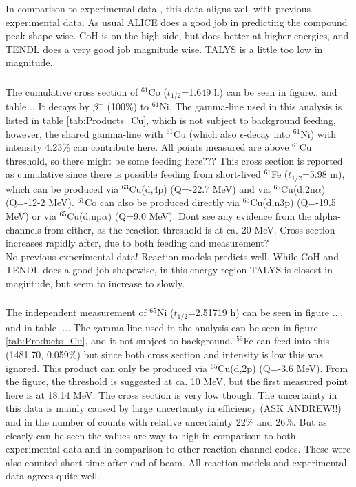 In comparison to experimental data \cite{Takacs2006a, Khandaker2014}, this data aligns well with previous experimental data. As usual ALICE does a good job in predicting the compound peak shape wise. CoH is on the high side, but does better at higher energies, and TENDL does a very good job magnitude wise. TALYS is a little too low in magnitude. 

\subsubsection{}
The cumulative cross section of $^{61}$Co ($t_{1/2}$=1.649 h) can be seen in figure.. and table .. It decays by $\beta^-$ (100\%) to $^{61}$Ni\cite{Zuber2015}. The gamma-line used in this analysis is listed in table \ref{tab:Products_Cu}, which is not subject to background feeding, however, the shared gamma-line with $^{61}$Cu (which also $\epsilon$-decay into $^{61}$Ni) with intensity 4.23\% can contribute here. All points measured are above $^{61}$Cu threshold, so there might be some feeding here??? This cross section is reported as cumulative since there is possible feeding from short-lived $^{61}$Fe ($t_{1/2}$=5.98 m), which can be produced via $^{63}$Cu(d,4p) (Q=-22.7 MeV) and via $^{65}$Cu(d,2n$\alpha$) (Q=-12-2 MeV). $^{61}$Co can also be produced directly via $^{63}$Cu(d,n3p) (Q=-19.5 MeV) or via $^{65}$Cu(d,np$\alpha$) (Q=9.0 MeV). Dont see any evidence from the alpha-channels from either, as the reaction threshold is at ca. 20 MeV. Cross section increases rapidly after, due to both feeding and measurement? \\ 

No previous experimental data! Reaction models predicts well. While CoH and TENDL does a good job shapewise, in this energy region TALYS is closest in magintude, but seem to increase to slowly. 

\subsubsection{}
The independent measurement of $^{65}$Ni ($t_{1/2}$=2.51719 h) can be seen in figure .... and in table .... The gamma-line used in the analysis can be seen in figure \ref{tab:Products_Cu}, and it not subject to background. $^{59}$Fe can feed into this (1481.70, 0.059\%) but since both cross section and intensity is low this was ignored. This product can only be produced via $^{65}$Cu(d,2p) (Q=-3.6 MeV). From the figure, the threshold is suggested at ca. 10 MeV, but the first measured point here is at 18.14 MeV. The cross section is very low though. The uncertainty in this data is mainly caused by large uncertainty in efficiency (ASK ANDREW!!) and in the number of counts with relative uncertainty 22\% and 26\%. But as clearly can be seen the values are way to high in comparison to both experimental data \cite{Takacs2006a} and in comparison to other reaction channel codes. These were also counted short time after end of beam. All reaction models and experimental data agrees quite well. 

